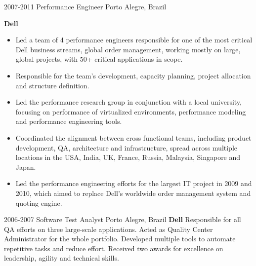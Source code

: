 \begin{entrylist}
{\begin{itemize}
      \end{itemize}
    }
  \entry
    {2007-2011}
    {Performance Engineer}
    {Porto Alegre, Brazil}
    {
      \textbf{Dell}
      \begin{itemize}
        \item Led a team of 4 performance engineers responsible for one of the most critical Dell business streams, global order management, working mostly on large, global projects, with 50+ critical applications in scope.
        \item Responsible for the team's development, capacity planning, project allocation and structure definition.
        \item Led the performance research group in conjunction with a local university, focusing on performance of virtualized environments, performance modeling and performance engineering tools.
        \item Coordinated the alignment between cross functional teams, including product development, QA, architecture and infrastructure, spread across multiple locations in the USA, India, UK, France, Russia, Malaysia, Singapore and Japan.
        \item Led the performance engineering efforts for the largest IT project in 2009 and 2010, which aimed to replace Dell's worldwide order management system and quoting engine.
      \end{itemize}
    }
  \entry
    {2006-2007}
    {Software Test Analyst}
    {Porto Alegre, Brazil}
    {
      \textbf{Dell}
      \newline
      Responsible for all QA efforts on three large-scale applications. Acted as Quality Center Administrator for the whole portfolio. Developed multiple tools to automate repetitive tasks and reduce effort. Received two awards for excellence on leadership, agility and technical skills.
}
\end{entrylist}
